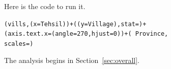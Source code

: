 Here is the code to run it.

\begin{knitrout}
\color{fgcolor}\begin{kframe}
\begin{alltt}
(vills, (x = Tehsil)) + ((y = Village), stat = ) + 
    (axis.text.x = (angle = 270, hjust = 0)) + (~Province, 
    scales = )
\end{alltt}
\end{kframe}
\end{knitrout}


The analysis begins in Section~\ref{sec:overall}.
